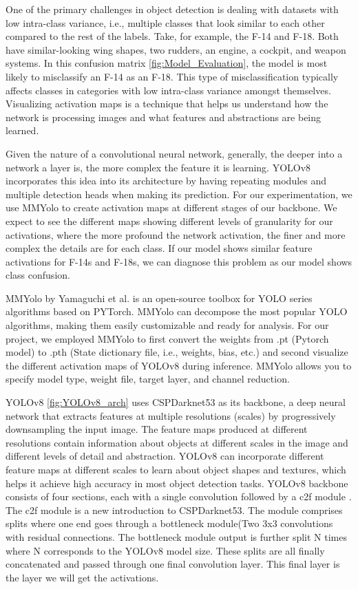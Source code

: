 \documentclass[10pt,twocolumn,letterpaper]{article}
\begin{document}
One of the primary challenges in object detection is dealing with datasets with low intra-class variance, i.e., multiple classes that look similar to each other compared to the rest of the labels. Take, for example, the F-14 and F-18. Both have similar-looking wing shapes, two rudders, an engine, a cockpit, and weapon systems. In this confusion matrix \ref{fig:Model_Evaluation}, the model is most likely to misclassify an F-14 as an F-18. This type of misclassification typically affects classes in categories with low intra-class variance amongst themselves. Visualizing activation maps \cite{MMYOLOViz} is a technique that helps us understand how the network is processing images and what features and abstractions are being learned. 

Given the nature of a convolutional neural network, generally, the deeper into a network a layer is, the more complex the feature it is learning. YOLOv8 incorporates this idea into its architecture by having repeating modules and multiple detection heads when making its prediction. For our experimentation, we use MMYolo \cite{MMYOLOViz} to create activation maps at different stages of our backbone. We expect to see the different maps showing different levels of granularity for our activations, where the more profound the network activation, the finer and more complex the details are for each class. If our model shows similar feature activations for F-14s and F-18s, we can diagnose this problem as our model shows class confusion.

MMYolo \cite{MMYOLOViz} by Yamaguchi et al. is an open-source toolbox for YOLO series algorithms based on PYTorch. MMYolo can decompose the most popular YOLO algorithms, making them easily customizable and ready for analysis. For our project, we employed MMYolo to first convert the weights from .pt (Pytorch model) to .pth (State dictionary file, i.e., weights, bias, etc.) and second visualize the different activation maps of YOLOv8 during inference. MMYolo allows you to specify model type, weight file, target layer, and channel reduction.

YOLOv8 \ref{fig:YOLOv8_arch} uses CSPDarknet53 \cite{darkNet} as its backbone, a deep neural network that extracts features at multiple resolutions (scales) by progressively downsampling the input image. The feature maps produced at different resolutions contain information about objects at different scales in the image and different levels of detail and abstraction. YOLOv8 can incorporate different feature maps at different scales to learn about object shapes and textures, which helps it achieve high accuracy in most object detection tasks. YOLOv8 backbone consists of four sections, each with a single convolution followed by a c2f module \cite{YOLOv8Website}. The c2f module is a new introduction to CSPDarknet53. The module comprises splits where one end goes through a bottleneck module(Two 3x3 convolutions with residual connections. The bottleneck module output is further split N times where N corresponds to the YOLOv8 model size. These splits are all finally concatenated and passed through one final convolution layer. This final layer is the layer we will get the activations.
\end{document}
